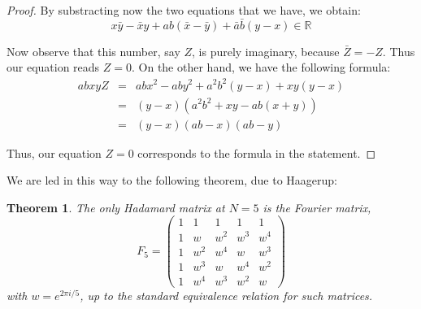 \documentclass[12pt]{amsbook}
\newtheorem{theorem}{Theorem}[chapter]
\begin{document}
\begin{proof}
By substracting now the two equations that we have, we obtain:
$$x\bar{y}-\bar{x}y+ab(\bar{x}-\bar{y})+\bar{a}\bar{b}(y-x)\in\mathbb R$$

Now observe that this number, say $Z$, is purely imaginary, because $\bar{Z}=-Z$. Thus our equation reads $Z=0$. On the other hand, we have the following formula:
\begin{eqnarray*}
abxyZ
&=&abx^2-aby^2+a^2b^2(y-x)+xy(y-x)\\
&=&(y-x)(a^2b^2+xy-ab(x+y))\\
&=&(y-x)(ab-x)(ab-y)
\end{eqnarray*}

Thus, our equation $Z=0$ corresponds to the formula in the statement.
\end{proof}

We are led in this way to the following theorem, due to Haagerup:

\begin{theorem}
The only Hadamard matrix at $N=5$ is the Fourier matrix,
$$F_5=\begin{pmatrix}
1&1&1&1&1\\
1&w&w^2&w^3&w^4\\
1&w^2&w^4&w&w^3\\
1&w^3&w&w^4&w^2\\
1&w^4&w^3&w^2&w
\end{pmatrix}$$
with $w=e^{2\pi i/5}$, up to the standard equivalence relation for such matrices. 
\end{theorem}
\end{document}
